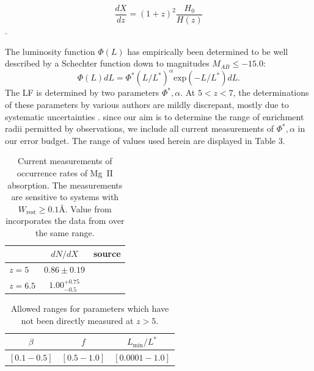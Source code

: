 \documentclass[useAMS,usenatbib]{mn2e}
\newcommand{\magtwo}{Mg~{\small II} }
\begin{document}
\begin{equation}
\frac{dX}{dz} = \left(1+z\right)^2 \frac{H_0}{H(z)}
\end{equation}.

The luminosity function $\Phi(L)$ has empirically been determined to be well described by a Schechter function down to magnitudes $M_{AB}\leq-15.0$:
\begin{equation} 
\Phi(L) dL = \Phi^* (L/L^*)^\alpha \text{exp} (-L/L^*) dL.
\end{equation}
The LF is determined by two parameters ${\Phi^*,\alpha}$. At $5<z<7$, the determinations of these parameters by various authors are mildly discrepant, mostly due to systematic uncertainties \citep{Bouwens16}. since our aim is to determine the range of enrichment radii permitted by observations, we include all current measurements of ${\Phi^*,\alpha}$ in our error budget. The range of values used herein are displayed in Table 3.

\begin{table}
\centering
\begin{tabular}{l c c}
 &$dN/dX$ & source \\
\hline
$z=5$ & $0.86\pm0.19$&\citet{Codoreanu17} \\
\hline
$z=6.5$&$1.00_{-0.5}^{+0.75}$&\citet{Bosman17}\\
\hline
\end{tabular}
\caption{Current measurements of occurrence rates of \magtwo absorption. The measurements are sensitive to systems with $W_\text{rest}\geq 0.1$\AA. Value from \citet{Bosman17} incorporates the data from \citet{Chen16} over the same range.}
\end{table}

\begin{table}
\centering
\begin{tabular}{c c c}
$\beta$&$f$&$L_\text{min}/L^*$ \\
\hline
$[0.1 - 0.5]$&$[0.5 - 1.0]$&$[0.0001 - 1.0]$\\
\end{tabular}
\caption{Allowed ranges for parameters which have not been directly measured at $z>5$.}
\end{table}
\end{document}
